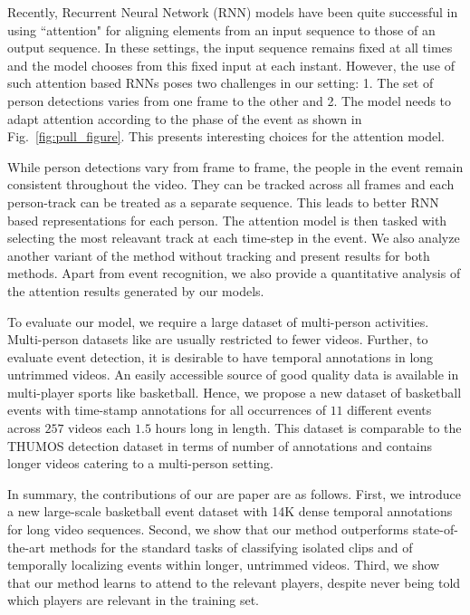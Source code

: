 Recently, Recurrent Neural Network (RNN) models have been quite successful in
using ``attention" \cite{Bahdnau_arxiv14,Xu_arxiv15,Yao_arxiv15} for aligning
elements from an input sequence to those of an output sequence. In these settings,
the input sequence remains fixed at all times and the model chooses from this
fixed input at each instant. However, the use of such attention based RNNs
poses two challenges in our setting:
1. The set of person detections varies from one frame to the other and
2. The model needs to adapt attention according to the phase of the event as
shown in Fig.~\ref{fig:pull_figure}. This presents interesting choices
for the attention model.

While person detections vary from frame to frame, the people in the event remain
consistent throughout the video. They can be tracked across all frames and each
person-track can be treated as a separate sequence. This leads to better RNN
based representations for each person.  The attention model is then tasked with
selecting the most releavant track at each time-step in the event.  We also
analyze another variant of the method without tracking and present results for
both methods. Apart from event recognition, we also provide a quantitative
analysis of the attention results generated by our models.

To evaluate our model, we require a large dataset of multi-person activities.
Multi-person datasets like \cite{Ryoo_ICCV09,VIRAT,Choi_ICCV09} are usually restricted to fewer videos.
Further, to evaluate event detection, it is desirable to have temporal annotations in long
untrimmed videos. An easily accessible source of good quality data is
available in multi-player sports like basketball.
Hence, we propose a new dataset of basketball events with time-stamp annotations for
all occurrences of $11$ different events across $257$ videos each $1.5$ hours
long in length.  This dataset is comparable to the THUMOS \cite{THUMOS}
detection dataset in terms of number of annotations and contains longer videos
catering to a multi-person setting.

In summary, the contributions of our are paper are as follows.  First, we
introduce a new  large-scale basketball event dataset with 14K dense temporal
annotations for long video sequences.  Second, we show that our method
outperforms state-of-the-art methods for the standard tasks of classifying
isolated clips and of temporally localizing events within longer, untrimmed
videos.  Third, we show that our method learns to attend to the relevant
players, despite never being told which players are relevant in the training
set.
